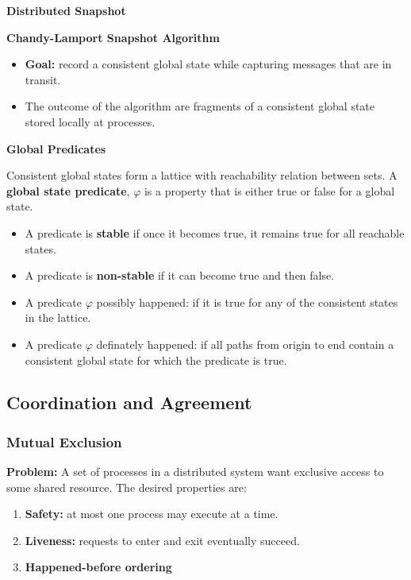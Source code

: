 \textbf{Distributed Snapshot}

\textbf{Chandy-Lamport Snapshot Algorithm}
\begin{itemize}
    \item \textbf{Goal:} record a consistent global state while capturing messages that are in transit.
    \item The outcome of the algorithm are fragments of a consistent global state stored locally at processes.
\end{itemize}

\textbf{Global Predicates}

Consistent global states form a lattice with reachability relation between sets.
A \textbf{global state predicate}, $\varphi$ is a property that is either true or false for a global state.
\begin{itemize}
    \item A predicate is \textbf{stable} if once it becomes true, it remains true for all reachable states.
    \item A predicate is \textbf{non-stable} if it can become true and then false.
    \item A predicate $\varphi$ possibly happened: if it is true for any of the consistent states in the lattice.
    \item A predicate $\varphi$ definately happened: if all paths from origin to end contain a consistent global state for which the predicate is true.
\end{itemize}

\subsection{Coordination and Agreement}

\subsubsection*{Mutual Exclusion}

\textbf{Problem:} A set of processes in a distributed system want exclusive access to some shared resource.
The desired properties are:
\begin{enumerate}
    \item \textbf{Safety:} at most one process may execute at a time.
    \item \textbf{Liveness:} requests to enter and exit eventually succeed.
    \item \textbf{Happened-before ordering}
\end{enumerate}

